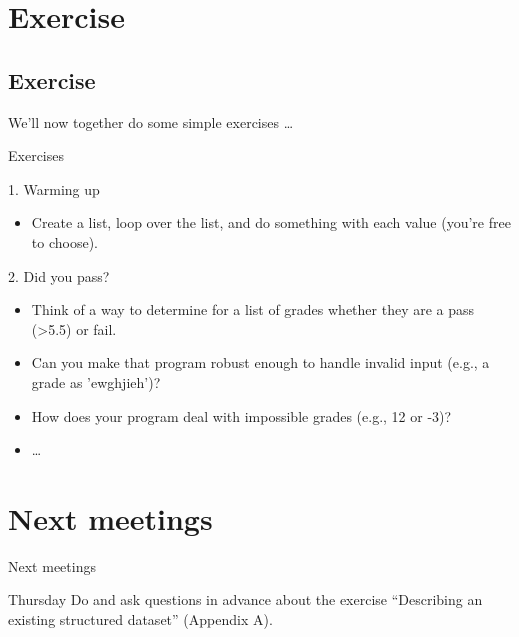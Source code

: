 \documentclass{beamer}
\begin{document}
\section{Exercise}
\subsection*{Exercise}
\begin{frame}
We'll now together do some simple exercises \ldots
\end{frame}



\begin{frame}{Exercises}
\begin{block}{1. Warming up}
\begin{itemize}
	\item Create a list, loop over the list, and do something with each value (you're free to choose). 
\end{itemize}
\end{block}
\begin{block}{2. Did you pass?}
	\begin{itemize}
	\item Think of a way to determine for a list of  grades whether they are a pass (>5.5) or fail.
	\item Can you make that program robust enough to handle invalid input (e.g., a grade as 'ewghjieh')?
	\item How does your program deal with impossible grades (e.g., 12 or -3)?
	\item \ldots
\end{itemize}
\end{block}
\end{frame}

\section{Next meetings}
\begin{frame}
Next meetings
\end{frame}


\begin{frame}{Thursday}
	Do and ask questions in advance about the exercise ``Describing an existing structured dataset'' (Appendix A).
\end{frame}
\end{document}
